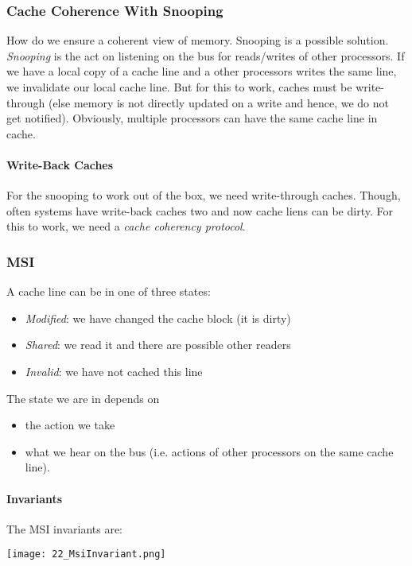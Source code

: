 \subsubsection{Cache Coherence With Snooping}
How do we ensure a coherent view of memory. Snooping is a possible solution. \textit{Snooping} is the act on listening on the bus for reads/writes of other processors. If we have a local copy of a cache line and a other processors writes the same line, we invalidate our local cache line. But for this to work, caches must be write-through (else memory is not directly updated on a write and hence, we do not get notified). Obviously, multiple processors can have the same cache line in cache.

\paragraph{Write-Back Caches}
For the snooping to work out of the box, we need write-through caches. Though, often systems have write-back caches two and now cache liens can be dirty. For this to work, we need a \textit{cache coherency protocol}.

\subsubsection{MSI}
A cache line can be in one of three states:
\begin{itemize}
    \item \textit{Modified}: we have changed the cache block (it is dirty)
    \item \textit{Shared}: we read it and there are possible other readers
    \item \textit{Invalid}: we have not cached this line
\end{itemize}

The state we are in depends on

\begin{itemize}
    \item the action we take
    \item what we hear on the bus (i.e. actions of other processors on the same cache line).
\end{itemize}

\paragraph{Invariants}
The MSI invariants are:

\texttt{[image: 22\_MsiInvariant.png]}

